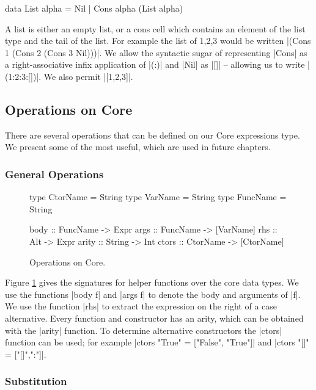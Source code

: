 \begin{code}
data List alpha = Nil | Cons alpha (List alpha)
\end{code}

A list is either an empty list, or a cons cell which contains an element of the list type and the tail of the list. For example the list of 1,2,3 would be written |(Cons 1 (Cons 2 (Cons 3 Nil)))|. We allow the syntactic sugar of representing |Cons| as a right-associative infix application of |(:)| and |Nil| as |[]| -- allowing us to write |(1:2:3:[])|. We also permit |[1,2,3]|.


\subsection{Operations on Core}

There are several operations that can be defined on our Core expressions type. We present some of the most useful, which are used in future chapters.

\subsubsection{General Operations}

\begin{figure}
\begin{code}
type CtorName  = String
type VarName   = String
type FuncName  = String

body   :: FuncName  -> Expr
args   :: FuncName  -> [VarName]
rhs    :: Alt       -> Expr
arity  :: String    -> Int
ctors  :: CtorName  -> [CtorName]
\end{code}
\caption{Operations on Core.}
\label{figB:core_operations}
\end{figure}

Figure \ref{figB:core_operations} gives the signatures for helper functions over the core data types. We use the functions |body f| and |args f| to denote the body and arguments of |f|. We use the function |rhs| to extract the expression on the right of a case alternative. Every function and constructor has an arity, which can be obtained with the |arity| function. To determine alternative constructors the |ctors| function can be used; for example |ctors "True" = ["False", "True"]| and |ctors "[]" = ["[]",":"]|.


\subsubsection{Substitution}


